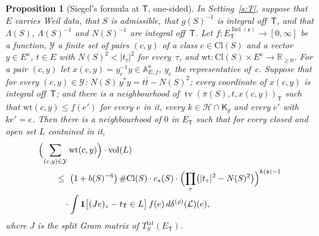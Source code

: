 \documentclass[11pt,a4paper]{article}
\newcommand{\m}[1]{\mbox{$#1$}}        %
\theoremstyle{plainx}
\newtheorem{proposition}[theorem]{Proposition}
\theoremstyle{uprightx}
\newcommand{\fs}{\mathfrak{s}}                      %
\newcommand{\sT}{\mathsf{T}}                        %
\newcommand{\cL}{\mathcal{L}}                       %
\newcommand{\AEf}{\mathbb{A}_{E,f}}
\newcommand{\kk}[1]{k(#1)}                          %
\newcommand{\Ix}[1]{\operatorname{Ind}(#1)}                          %
\newcommand{\ET}[1]{E_{#1}}                         %
\newcommand{\bS}[1]{b(#1)}                          %
\newcommand{\NS}[1]{N(#1)}                          %
\newcommand{\piS}[1]{\bar\pi(#1)}                   %
\newcommand{\Tlat}[2]{T^{\mathrm{lat}}_{#1}(#2)}    %
\newcommand{\Cl}[1]{\mathrm{Cl}(#1)}                %
\newcommand{\gid}[1]{\hat{g}(#1)}                   %
\newcommand{\latB}[1]{\Lambda(#1)}                  %
\newcommand{\siegC}[1]{c_{*}(#1)}                   %
\newcommand{\tailv}[3]{\operatorname{tv}(#1,#2,#3)} %
\newcommand{\vol}{\operatorname{vol}}
\newcommand{\RR}{\mathbb{R}}
\newcommand{\quadric}[2]{\delta^{(#2)}(#1)}         %
\begin{document}
\begin{proposition}[Siegel's formula at $\sT$, one-sided]\label{p:siegel}
In Setting~\ref{s:T}, suppose that $E$ carries Weil data, that $S$ is admissible, that \m{\gid{S}^{-1}} is
integral off~$\sT$, and that \m{\latB{S}}, \m{\latB{S}^{-1}} and \m{\NS{S}^{-1}} are integral off~$\sT$. Let
\m{f\colon\ET{\sT}^{\Ix{\fs}}\to[0,\infty]} be a function, $\mathcal Y$ a finite set of pairs \m{(c,y)} of a class
\m{c\in\Cl{S}} and a vector \m{y\in E^\kappa}, \m{t\in E} with \m{\NS{S}^2<|t_\tau|^2} for every~$\tau$, and
\m{\mathrm{wt}\colon\Cl{S}\times E^\kappa\to\RR_{\ge0}}. For a pair \m{(c,y)} let \m{x(c,y)=y_c^{-1}y\in\AEf^\kappa},
$y_c$ the representative of~$c$. Suppose that for every \m{(c,y)\in\mathcal Y}:
\m{\NS{S}\,y^*y=t\bar t-\NS{S}^2}; every coordinate of \m{x(c,y)} is integral off~$\sT$; and there is a
neighbourhood of \m{\tailv{\piS{S}}{t}{x(c,y)}_{\sT}} such that \m{\mathrm{wt}(c,y)\le f(e')} for every $e$ in it,
every \m{k\in\mathcal H\cap \mathsf{K}_g} and every $e'$ with \m{ke'=e}. Then there is a neighbourhood of $0$ in
\m{\ET{\sT}} such that for every closed and open set $L$ contained in it,
\[\begin{aligned}&\Bigl(\sum_{(c,y)\in\mathcal Y}\mathrm{wt}(c,y)\Bigr)\cdot\vol(L)\\
&\qquad\le\ \bigl(1+\bS{S}^{-6}\bigr)\,\#\Cl{S}\cdot\siegC{S}\cdot\Bigl(\prod_\tau\bigl(|t_\tau|^2-\NS{S}^2\bigr)\Bigr)^{\kk{\fs}-1}\\
&\qquad\quad\cdot\int\mathbf 1\bigl[(Je)_z-t_{\sT}\in L\bigr]\,f(e)\,d\quadric{\cL}{\varrho}(e),\end{aligned}\]
where $J$ is the split Gram matrix of \m{\Tlat{S}{\ET{\sT}}}.
\end{proposition}
\end{document}
